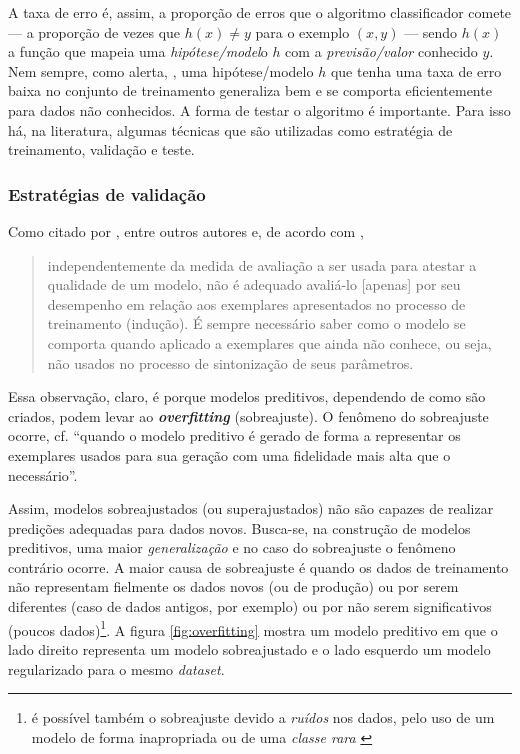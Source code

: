 A taxa de erro é, assim, a proporção de erros que o algoritmo classificador comete --- a proporção de vezes que $h(x)\neq y$ para o exemplo $(x,y)$ --- sendo $h(x)$ a função que mapeia uma \textit{hipótese/model}o $h$ com a \textit{previsão/valor} conhecido $y$. Nem sempre, como alerta, \cite{Norvig2013}, uma hipótese/modelo $h$ que tenha uma taxa de erro baixa no conjunto de treinamento generaliza bem e se comporta eficientemente para dados não conhecidos. A forma de testar o algoritmo é importante. Para isso há, na literatura, algumas técnicas que são utilizadas como estratégia de treinamento, validação e teste.

\subsubsection{Estratégias de validação}\label{estrategias_validacao}

Como citado por \cite{Norvig2013}, \cite{luger_inteligencia_2015} entre outros autores e, de acordo com \cite[p. 125]{Boscarioli2017}, \begin{quote}
	independentemente da medida de avaliação a ser usada para atestar a qualidade de um modelo, não é adequado avaliá-lo [apenas] por seu desempenho em relação aos exemplares apresentados no processo de treinamento (indução). É sempre necessário saber como o modelo se comporta quando aplicado a exemplares que ainda não conhece, ou seja, não usados no processo de sintonização de seus parâmetros.
\end{quote}

Essa observação, claro, é porque modelos preditivos, dependendo de como são criados, podem levar ao \textit{\textbf{overfitting}} (sobreajuste). O fenômeno do sobreajuste ocorre, cf. \cite{Boscarioli2017} ``quando o modelo preditivo é gerado de forma a representar os exemplares usados para sua geração com uma fidelidade mais alta que o necessário''. 

Assim, modelos sobreajustados (ou superajustados) não são capazes de realizar predições adequadas para dados novos. Busca-se, na construção de modelos preditivos, uma maior \textit{generalização} e no caso do sobreajuste o fenômeno contrário ocorre. A maior causa de sobreajuste é quando os dados de treinamento não representam fielmente os dados novos (ou de produção) ou por serem diferentes (caso de dados antigos, por exemplo) ou por não serem significativos (poucos dados)\footnote{ é possível também o sobreajuste devido a \textit{ruídos} nos dados, pelo uso de um modelo de forma inapropriada ou de uma \textit{classe rara} \cite[p.35]{aprenda_mineracao_fernando_amaral16}}. A figura \ref{fig:overfitting} mostra um modelo preditivo em que o lado direito representa um modelo sobreajustado e o lado esquerdo um modelo regularizado para o mesmo \textit{dataset}.

